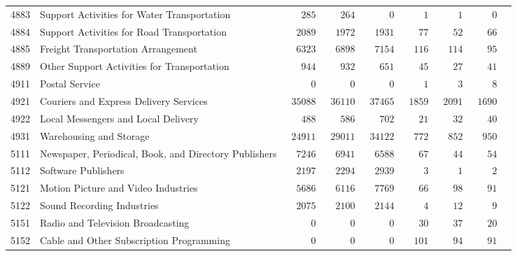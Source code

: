 \documentclass[9pt, oneside]{article}   	%
\begin{document}
\begin{longtable}{lp{3 in}ccccccc}
4883  & Support Activities for Water Transportation & $\phantom{000}285$ & $\phantom{000}264$ & $\phantom{00000}0$ & $\phantom{0000}1$ & $\phantom{0000}1$ & $\phantom{0000}0$ \\
4884  & Support Activities for Road Transportation & $\phantom{00}2089$ & $\phantom{00}1972$ & $\phantom{00}1931$ & $\phantom{000}77$ & $\phantom{000}52$ & $\phantom{000}66$ \\
4885  & Freight Transportation Arrangement & $\phantom{00}6323$ & $\phantom{00}6898$ & $\phantom{00}7154$ & $\phantom{00}116$ & $\phantom{00}114$ & $\phantom{000}95$ \\
4889  & Other Support Activities for Transportation & $\phantom{000}944$ & $\phantom{000}932$ & $\phantom{000}651$ & $\phantom{000}45$ & $\phantom{000}27$ & $\phantom{000}41$ \\
4911  & Postal Service & $\phantom{00000}0$ & $\phantom{00000}0$ & $\phantom{00000}0$ & $\phantom{0000}1$ & $\phantom{0000}3$ & $\phantom{0000}8$ \\
4921  & Couriers and Express Delivery Services & $\phantom{0}35088$ & $\phantom{0}36110$ & $\phantom{0}37465$ & $\phantom{0}1859$ & $\phantom{0}2091$ & $\phantom{0}1690$ \\
4922  & Local Messengers and Local Delivery & $\phantom{000}488$ & $\phantom{000}586$ & $\phantom{000}702$ & $\phantom{000}21$ & $\phantom{000}32$ & $\phantom{000}40$ \\
4931  & Warehousing and Storage & $\phantom{0}24911$ & $\phantom{0}29011$ & $\phantom{0}34122$ & $\phantom{00}772$ & $\phantom{00}852$ & $\phantom{00}950$ \\
5111  & Newspaper, Periodical, Book, and Directory Publishers & $\phantom{00}7246$ & $\phantom{00}6941$ & $\phantom{00}6588$ & $\phantom{000}67$ & $\phantom{000}44$ & $\phantom{000}54$ \\
5112  & Software Publishers & $\phantom{00}2197$ & $\phantom{00}2294$ & $\phantom{00}2939$ & $\phantom{0000}3$ & $\phantom{0000}1$ & $\phantom{0000}2$ \\
5121  & Motion Picture and Video Industries & $\phantom{00}5686$ & $\phantom{00}6116$ & $\phantom{00}7769$ & $\phantom{000}66$ & $\phantom{000}98$ & $\phantom{000}91$ \\
5122  & Sound Recording Industries & $\phantom{00}2075$ & $\phantom{00}2100$ & $\phantom{00}2144$ & $\phantom{0000}4$ & $\phantom{000}12$ & $\phantom{0000}9$ \\
5151  & Radio and Television Broadcasting & $\phantom{00000}0$ & $\phantom{00000}0$ & $\phantom{00000}0$ & $\phantom{000}30$ & $\phantom{000}37$ & $\phantom{000}20$ \\
5152  & Cable and Other Subscription Programming & $\phantom{00000}0$ & $\phantom{00000}0$ & $\phantom{00000}0$ & $\phantom{00}101$ & $\phantom{000}94$ & $\phantom{000}91$ \\


\end{longtable}
\end{document}
